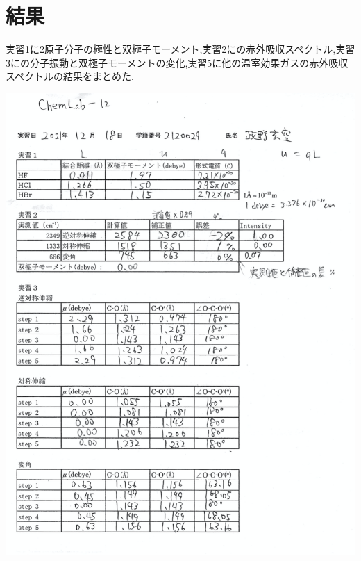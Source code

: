 \documentclass[a4j,10pt,dvipdfmx]{jarticle}
\begin{document}
  \section{結果}
  実習1に2原子分子の極性と双極子モーメント,実習2にの赤外吸収スペクトル,実習3にの分子振動と双極子モーメントの変化,実習5に他の温室効果ガスの赤外吸収スペクトルの結果をまとめた.
  \begin{center}
    \includegraphics[width=15cm]{hyou1.png}
  \end{center}
\end{document}
